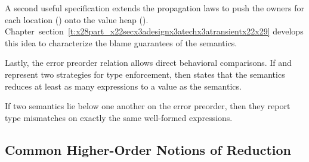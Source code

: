 \documentclass[ twoside,open=right,titlepage,numbers=noenddot,headinclude,%
                footinclude=true,cleardoublepage=empty,abstract=off,
                BCOR=5mm,paper=a4,fontsize=11pt,%
                ngerman,american,%
                parts,pdfspacing]{scrreprt}
\newcommand{\SecRef}[2]{section~#1}
\newcommand{\SecRefLocal}[3]{\hyperref[#1]{\SecRef{#2}{#3}}}
\newcommand{\Ssubsubsection}[2]{\subsubsection[#1]{#2}}
\renewcommand{\Ssubsubsection}[2]{\subsection[#1]{#2}}
\renewcommand{\SecRefLocal}[3]{section~\ref{#1}}
\begin{document}
\noindent{}A second useful specification extends the propagation laws to push the owners
 for each location (\relax{$\eloc$}) onto the value heap (\relax{$\vstore$}).
Chapter~\SecRefLocal{t:x28part_x22secx3adesignx3atechx3atransientx22x29}{4.5.8}{\relax{\tname} and its Properties} develops this idea to characterize the blame
 guarantees of the \relax{\tname} semantics.

Lastly, the error preorder relation allows direct behavioral comparisons.
If \relax{$\xsym$} and \relax{$\ysym$} represent two strategies for type enforcement,
 then \relax{$\xsym \sbehaviorle \ysym$} states that the \relax{$\ysym$} semantics
 reduces at least as many expressions to a value as the \relax{$\xsym$} semantics.


\noindent{}If two semantics lie below one another on the error preorder, then they report
 type mismatches on exactly the same well{-}formed expressions.


\Ssubsubsection{Common Higher{-}Order Notions of Reduction}{Common Higher{-}Order Notions of Reduction}\label{t:x28part_x22secx3adesignx3atechx3acommonx2dHOx22x29}

\label{sec:design:tech:common-HO}
\end{document}
